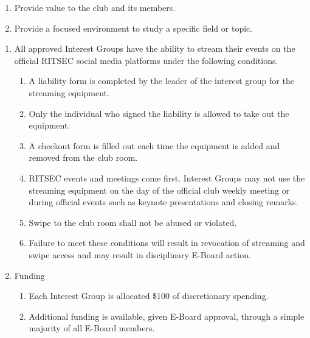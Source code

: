 

\begin{enumerate}
	\item Provide value to the club and its members.
	\item Provide a focused environment to study a specific field or topic.
\end{enumerate}


\begin{enumerate}
	\item All approved Interest Groups have the ability to stream their events on the
	      official RITSEC social media platforms under the following conditions.
	      \begin{enumerate}
		      \item A liability form is completed by the leader of the interest group for the
		            streaming equipment.
		      \item Only the individual who signed the liability is allowed to take out the
		            equipment.
		      \item A checkout form is filled out each time the equipment is added and removed from
		            the club room.
		      \item RITSEC events and meetings come first. Interest Groups may not use the
		            streaming equipment on the day of the official club weekly meeting or during
		            official events such as keynote presentations and closing remarks.
		      \item Swipe to the club room shall not be abused or violated.
		      \item Failure to meet these conditions will result in revocation of streaming and
		            swipe access and may result in disciplinary E-Board action.
	      \end{enumerate}
	\item Funding
	      \begin{enumerate}
		      \item Each Interest Group is allocated \$100 of discretionary spending.
		      \item Additional funding is available, given E-Board approval, through a simple
		            majority of all E-Board members.
	      \end{enumerate}
\end{enumerate}

